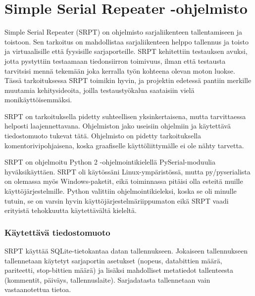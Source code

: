 
\section{Simple Serial Repeater -ohjelmisto}

Simple Serial Repeater (SRPT) on ohjelmisto sarjaliikenteen tallentamiseen ja toistoon. Sen tarkoitus on mahdollistaa sarjaliikenteen helppo tallennus ja toisto ja virtuaalisille että fyysisille sarjaporteille. SRPT kehitettiin testauksen avuksi, jotta pystyttiin testaamaan tiedonsiirron toimivuus, ilman että testausta tarvitsisi mennä tekemään joka kerralla työn kohteena olevan moton luokse. Tässä tarkoituksessa SRPT toimikin hyvin, ja projektin edetessä pantiin merkille muutamia kehitysideoita, joilla testaustyökalua saataisiin vielä monikäyttöisemmäksi.

SRPT on tarkoituksella pidetty suhteellisen yksinkertaisena, mutta tarvittaessa helposti laajennettavana. Ohjelmiston jako useisiin ohjelmiin ja käytettävä tiedostomuoto tukevat tätä. Ohjelmisto on pidetty tarkoituksella komentorivipohjaisena, koska graafiselle käyttöliittymälle ei ole nähty tarvetta.

SRPT on ohjelmoitu Python 2 -ohjelmointikielellä PySerial-moduulia hyväksikäyttäen. SRPT oli käytössäni Linux-ympäristössä, mutta py/pyserialista on olemassa myös Windows-paketit, eikä toiminnassa pitäisi olla esteitä muille käyttöjärjestelmille. Python valittiin ohjelmointikieleksi, koska se oli minulle tutuin, se on varsin hyvin käyttöjärjestelmäriippumaton eikä SRPT vaadi erityistä tehokkuutta käytettävältä kieleltä.

\subsubsection{Käytettävä tiedostomuoto}
SRPT käyttää SQLite-tietokantaa datan tallennukseen. Jokaiseen tallennukseen tallennetaan käytetyt sarjaportin asetukset (nopeus, databittien määrä, pariteetti, stop-bittien määrä) ja lisäksi mahdolliset metatiedot tallenteesta (kommentit, päiväys, tallennuslaite). Sarjadatasta tallennetaan vain vastaanotettua tietoa.

